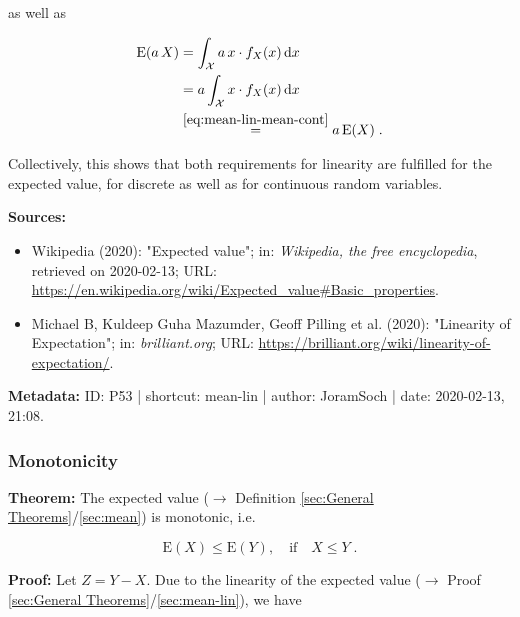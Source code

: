 \documentclass[a4paper,12pt]{book}
\begin{document}
as well as

\begin{equation} \label{eq:mean-lin-mean-lin-s2-cont}
\begin{split}
\mathrm{E}(a\,X) &= \int_{\mathcal{X}} a \, x \cdot f_X(x) \, \mathrm{d}x \\
&= a \int_{\mathcal{X}} x \cdot f_X(x) \, \mathrm{d}x \\
&\overset{\eqref{eq:mean-lin-mean-cont}}{=} a \, \mathrm{E}(X) \; .
\end{split}
\end{equation}

\vspace{1em}
Collectively, this shows that both requirements for linearity are fulfilled for the expected value, for discrete as well as for continuous random variables.

\vspace{1em}
\textbf{Sources:}
\begin{itemize}
\item Wikipedia (2020): "Expected value"; in: \textit{Wikipedia, the free encyclopedia}, retrieved on 2020-02-13; URL: \url{https://en.wikipedia.org/wiki/Expected_value#Basic_properties}.
\item Michael B, Kuldeep Guha Mazumder, Geoff Pilling et al. (2020): "Linearity of Expectation"; in: \textit{brilliant.org}; URL: \url{https://brilliant.org/wiki/linearity-of-expectation/}.
\end{itemize}


\vspace{1em}
\textbf{Metadata:} ID: P53 | shortcut: mean-lin | author: JoramSoch | date: 2020-02-13, 21:08.


\subsubsection[\textbf{Monotonicity}]{Monotonicity} \label{sec:mean-mono}

\vspace{1em}
\textbf{Theorem:} The expected value ($\rightarrow$ Definition \ref{sec:General Theorems}/\ref{sec:mean}) is monotonic, i.e.

\begin{equation} \label{eq:mean-mono-mean-mono}
\mathrm{E}(X) \leq \mathrm{E}(Y), \quad \text{if} \quad X \leq Y \; .
\end{equation}


\vspace{1em}
\textbf{Proof:} Let $Z = Y - X$. Due to the linearity of the expected value ($\rightarrow$ Proof \ref{sec:General Theorems}/\ref{sec:mean-lin}), we have
\end{document}
